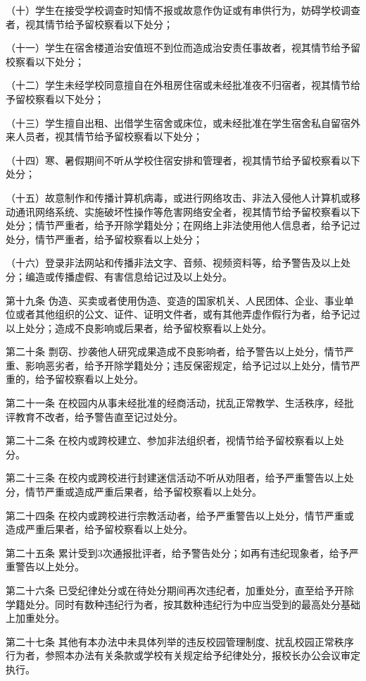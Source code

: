 \documentclass[UTF8,12pt,a4paper]{report}
\begin{document}
（十）学生在接受学校调查时知情不报或故意作伪证或有串供行为，妨碍学校调查者，视其情节给予留校察看以下处分；

（十一）学生在宿舍楼道治安值班不到位而造成治安责任事故者，视其情节给予留校察看以下处分；

（十二）学生未经学校同意擅自在外租房住宿或未经批准夜不归宿者，视其情节给予留校察看以下处分；

（十三）学生擅自出租、出借学生宿舍或床位，或未经批准在学生宿舍私自留宿外来人员者，视其情节给予留校察看以下处分；

（十四）寒、暑假期间不听从学校住宿安排和管理者，视其情节给予留校察看以下处分；

（十五）故意制作和传播计算机病毒，或进行网络攻击、非法入侵他人计算机或移动通讯网络系统、实施破坏性操作等危害网络安全者，视其情节给予留校察看以下处分；情节严重者，给予开除学籍处分；在网络上非法使用他人信息者，给予记过处分，情节严重者，给予留校察看以上处分；

（十六）登录非法网站和传播非法文字、音频、视频资料等，给予警告及以上处分；编造或传播虚假、有害信息给记过及以上处分。

第十九条  伪造、买卖或者使用伪造、变造的国家机关、人民团体、企业、事业单位或者其他组织的公文、证件、证明文件者，或有其他弄虚作假行为者，给予记过以上处分；造成不良影响或后果者，给予留校察看以上处分。

第二十条  剽窃、抄袭他人研究成果造成不良影响者，给予警告以上处分，情节严重、影响恶劣者，给予开除学籍处分；违反保密规定，给予记过以上处分，情节严重的，给予留校察看以上处分。

第二十一条  在校园内从事未经批准的经商活动，扰乱正常教学、生活秩序，经批评教育不改者，给予警告直至记过处分。

第二十二条  在校内或跨校建立、参加非法组织者，视情节给予留校察看以上处分。

第二十三条  在校内或跨校进行封建迷信活动不听从劝阻者，给予严重警告以上处分，情节严重或造成严重后果者，给予留校察看以上处分。

第二十四条  在校内或跨校进行宗教活动者，给予严重警告以上处分，情节严重或造成严重后果者，给予留校察看以上处分。

第二十五条  累计受到3次通报批评者，给予警告处分；如再有违纪现象者，给予严重警告以上处分。

第二十六条  已受纪律处分或在待处分期间再次违纪者，加重处分，直至给予开除学籍处分。同时有数种违纪行为者，按其数种违纪行为中应当受到的最高处分基础上加重处分。

第二十七条  其他有本办法中未具体列举的违反校园管理制度、扰乱校园正常秩序行为者，参照本办法有关条款或学校有关规定给予纪律处分，报校长办公会议审定执行。
\end{document}
